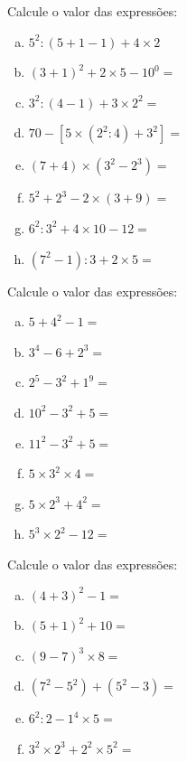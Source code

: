 \item Calcule o valor das expressões:
\begin{multicols}{2}
\begin{enumerate}[a)]
	\item $5^2 : ( 5 +1 -1)+ 4 \times 2$
	\item $(3 +1)^2 +2 \times 5 - 10^0 =$
	\item $3^2: ( 4 - 1) + 3 \times 2^2 =$
	\item $70 -[ 5 \times (2^2 : 4) + 3^2] =$
	\item $( 7 + 4) \times ( 3^2 - 2^3) =$
	\item $5^2 + 2^3 - 2 \times (3 + 9) =$
	\item $6^2 : 3^2 + 4 \times 10 - 12 =$
	\item $(7^2 - 1 ) : 3 + 2 \times 5 =$
\end{enumerate}
\end{multicols}

\item Calcule o valor das expressões:
\begin{multicols}{4}
\begin{enumerate}[a)]
	\item $5 + 4^2- 1 =$
	\item $ 3^4 - 6 + 2^3 =$
	\item $2^5 - 3^2 + 1^9 =$
	\item $10^2- 3^2 + 5 =$
	\item $11^2 - 3^2 + 5 =$
	\item $5 \times 3^2 \times 4 = $
	\item $5 \times 2^3 + 4^2 =$
	\item $5^3 \times 2^2 - 12 =$
\end{enumerate}
\end{multicols}

\item Calcule o valor das expressões:
\begin{multicols}{3}
\begin{enumerate}[a)]
	\item $( 4 + 3)^2 - 1 =$
	\item $( 5 + 1 )^2 + 10 =$
	\item $( 9 - 7 )^3 \times 8 =$
	\item $( 7^2 - 5^2) + ( 5^2 - 3 ) =$
	\item $6^2 : 2 - 1^4 \times 5 =$
	\item $3^2 \times 2^3 + 2^2 \times 5^2 =$
\end{enumerate}
\end{multicols}

